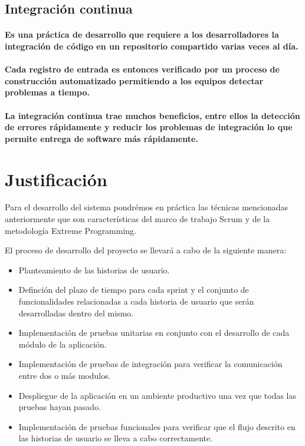 \subsection{Integración continua}
  \paragraph{Es una práctica de desarrollo que requiere a los desarrolladores la integración de código en un repositorio compartido varias veces al día.}
  \paragraph{Cada registro de entrada es entonces verificado por un proceso de construcción automatizado permitiendo a los equipos detectar problemas a tiempo.}
  \paragraph{La integración continua trae muchos beneficios, entre ellos la detección de errores rápidamente y reducir los problemas de integración lo que permite entrega de software más rápidamente.}

\section{Justificación}

Para el desarrollo del sistema pondrémos en práctica las técnicas mencionadas anteriormente que son características del marco de trabajo Scrum y de la metodología Extreme Programming.

El proceso de desarrollo del proyecto se llevará a cabo de la siguiente manera:

\begin{itemize}
  \item Planteamiento de las historias de usuario. 
  \item Definción del plazo de tiempo para cada sprint y el conjunto de funcionalidades relacionadas a cada historia de usuario que serán desarrolladas dentro del mismo.  
  \item Implementación de pruebas unitarias en conjunto con el desarrollo de cada módulo de la aplicación. 
  \item Implementación de pruebas de integración para verificar la comunicación entre dos o más modulos.
  \item Despliegue de la aplicación en un ambiente productivo una vez que todas las pruebas hayan pasado.
  \item Implementación de pruebas funcionales para verificar que el flujo descrito en las historias de usuario se lleva a cabo correctamente.
\end{itemize}
